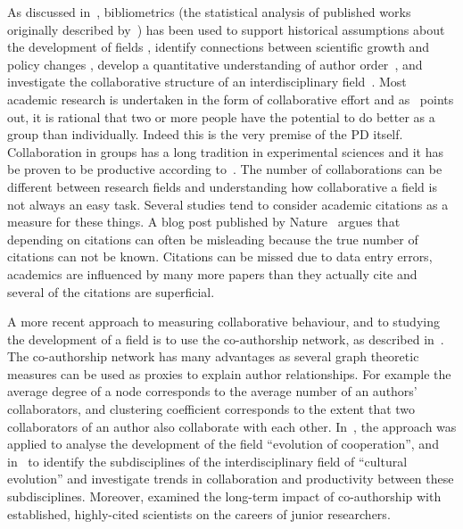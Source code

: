 \documentclass{article}
\theoremstyle{definition}
\begin{document}
As discussed in~\citep{youngblood2018}, bibliometrics (the statistical analysis
of published works originally described by~\citep{pritchard1969}) has been used
to support historical assumptions about the development of fields
\citep{raina1998}, identify connections between scientific growth and policy
changes \citep{das2016}, develop a quantitative understanding of author
order~\citep{sekara2018}, and investigate the collaborative structure of an
interdisciplinary field~\citep{Liu2015}. Most academic research is undertaken in
the form of collaborative effort and as~\citep{Kyvik2017} points out, it is
rational that two or more people have the potential to do better as a group
than individually. Indeed this is the very premise of the PD itself.
Collaboration in groups has a long tradition in experimental
sciences and it has be proven to be productive according
to~\citep{Etzkowitz1992}. The number of collaborations can be different
between research fields and understanding how collaborative a field is not
always an easy task. Several studies tend to consider academic citations as a
measure for these things. A blog post published by Nature~\citep{nature_blog}
argues that depending on citations can often be misleading because the true
number of citations can not be known. Citations can be missed due to data entry
errors, academics are influenced by many more papers than they actually cite and
several of the citations are superficial.

A more recent approach to measuring collaborative behaviour, and to studying the
development of a field is to use the co-authorship network, as described
in~\citep{Liu2015}. The co-authorship network has many advantages as several
graph theoretic measures can be used as proxies to explain author relationships.
For example the average degree of a node corresponds to the average number of
an authors' collaborators, and clustering coefficient corresponds to the extent that
two collaborators of an author also collaborate with each other.
In~\citep{Liu2015}, the approach was applied to analyse the development of the field
``evolution of cooperation'', and in~\citep{youngblood2018} to identify the
subdisciplines of the interdisciplinary field of ``cultural evolution'' and
investigate trends in collaboration and productivity between these subdisciplines.
Moreover, \citep{Li2019} examined the
long-term impact of co-authorship with established, highly-cited scientists on
the careers of junior researchers.
\end{document}
